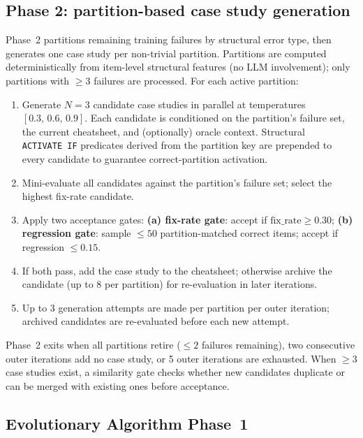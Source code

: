 \documentclass{article}
\begin{document}
\subsection{Phase 2: partition-based case study generation}
\label{sec:phase2}

Phase~2 partitions remaining training failures by structural error type, then generates one
case study per non-trivial partition.
Partitions are computed deterministically from item-level structural features (no LLM
involvement); only partitions with $\geq 3$ failures are processed.
For each active partition:

\begin{enumerate}[noitemsep,topsep=2pt]
  \item Generate $N=3$ candidate case studies in parallel at temperatures
        $[0.3,\,0.6,\,0.9]$.
        Each candidate is conditioned on the partition's failure set, the current cheatsheet,
        and (optionally) oracle context.
        Structural \texttt{ACTIVATE~IF} predicates derived from the partition key are
        prepended to every candidate to guarantee correct-partition activation.
  \item Mini-evaluate all candidates against the partition's failure set; select the
        highest fix-rate candidate.
  \item Apply two acceptance gates:
        \textbf{(a) fix-rate gate}: accept if $\text{fix\_rate} \geq 0.30$;
        \textbf{(b) regression gate}: sample $\leq 50$ partition-matched correct items;
        accept if regression $\leq 0.15$.
  \item If both pass, add the case study to the cheatsheet; otherwise archive the candidate
        (up to 8 per partition) for re-evaluation in later iterations.
  \item Up to 3 generation attempts are made per partition per outer iteration;
        archived candidates are re-evaluated before each new attempt.
\end{enumerate}

Phase~2 exits when all partitions retire ($\leq 2$ failures remaining), two consecutive outer
iterations add no case study, or 5 outer iterations are exhausted.
When $\geq 3$ case studies exist, a similarity gate checks whether new candidates duplicate
or can be merged with existing ones before acceptance.

\subsection{Evolutionary Algorithm Phase~1}
\label{sec:ea_method}
\end{document}
